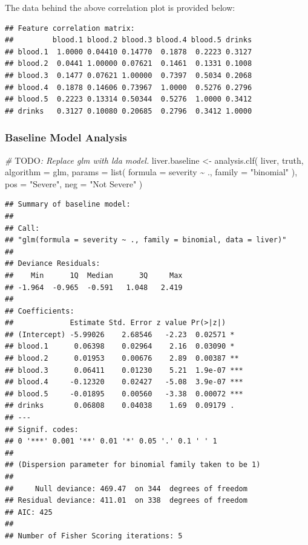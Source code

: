 \documentclass[
  11pt,
  a4paper,
]{scrartcl}
\newenvironment{Shaded}{\begin{snugshade}}{\end{snugshade}}
\newcommand{\AlertTok}[1]{\textcolor[rgb]{0.94,0.16,0.16}{#1}}
\newcommand{\AttributeTok}[1]{\textcolor[rgb]{0.77,0.63,0.00}{#1}}
\newcommand{\CommentTok}[1]{\textcolor[rgb]{0.56,0.35,0.01}{\textit{#1}}}
\newcommand{\FunctionTok}[1]{\textcolor[rgb]{0.00,0.00,0.00}{#1}}
\newcommand{\NormalTok}[1]{#1}
\newcommand{\OtherTok}[1]{\textcolor[rgb]{0.56,0.35,0.01}{#1}}
\newcommand{\SpecialCharTok}[1]{\textcolor[rgb]{0.00,0.00,0.00}{#1}}
\newcommand{\StringTok}[1]{\textcolor[rgb]{0.31,0.60,0.02}{#1}}
\begin{document}
The data behind the above correlation plot is provided below:

\begin{verbatim}
## Feature correlation matrix: 
##         blood.1 blood.2 blood.3 blood.4 blood.5 drinks
## blood.1  1.0000 0.04410 0.14770  0.1878  0.2223 0.3127
## blood.2  0.0441 1.00000 0.07621  0.1461  0.1331 0.1008
## blood.3  0.1477 0.07621 1.00000  0.7397  0.5034 0.2068
## blood.4  0.1878 0.14606 0.73967  1.0000  0.5276 0.2796
## blood.5  0.2223 0.13314 0.50344  0.5276  1.0000 0.3412
## drinks   0.3127 0.10080 0.20685  0.2796  0.3412 1.0000
\end{verbatim}

\hypertarget{baseline-model-analysis}{%
\subsubsection{Baseline Model Analysis}\label{baseline-model-analysis}}

\begin{Shaded}
\begin{Highlighting}[]
\CommentTok{\# }\AlertTok{TODO}\CommentTok{: Replace glm with lda model.}
\NormalTok{liver.baseline }\OtherTok{\textless{}{-}} \FunctionTok{analysis.clf}\NormalTok{(}
\NormalTok{  liver, truth,}
  \AttributeTok{algorithm =}\NormalTok{ glm,}
  \AttributeTok{params =} \FunctionTok{list}\NormalTok{(}
    \AttributeTok{formula =}\NormalTok{ severity }\SpecialCharTok{\textasciitilde{}}\NormalTok{ .,}
    \AttributeTok{family =} \StringTok{"binomial"}
\NormalTok{  ),}
  \AttributeTok{pos =} \StringTok{"Severe"}\NormalTok{, }\AttributeTok{neg =} \StringTok{"Not Severe"}
\NormalTok{)}
\end{Highlighting}
\end{Shaded}

\begin{verbatim}
## Summary of baseline model: 
## 
## Call:
## "glm(formula = severity ~ ., family = binomial, data = liver)"
## 
## Deviance Residuals: 
##    Min      1Q  Median      3Q     Max  
## -1.964  -0.965  -0.591   1.048   2.419  
## 
## Coefficients:
##             Estimate Std. Error z value Pr(>|z|)    
## (Intercept) -5.99026    2.68546   -2.23  0.02571 *  
## blood.1      0.06398    0.02964    2.16  0.03090 *  
## blood.2      0.01953    0.00676    2.89  0.00387 ** 
## blood.3      0.06411    0.01230    5.21  1.9e-07 ***
## blood.4     -0.12320    0.02427   -5.08  3.9e-07 ***
## blood.5     -0.01895    0.00560   -3.38  0.00072 ***
## drinks       0.06808    0.04038    1.69  0.09179 .  
## ---
## Signif. codes:  
## 0 '***' 0.001 '**' 0.01 '*' 0.05 '.' 0.1 ' ' 1
## 
## (Dispersion parameter for binomial family taken to be 1)
## 
##     Null deviance: 469.47  on 344  degrees of freedom
## Residual deviance: 411.01  on 338  degrees of freedom
## AIC: 425
## 
## Number of Fisher Scoring iterations: 5
\end{verbatim}
\end{document}

